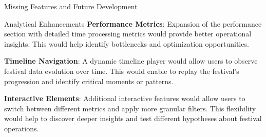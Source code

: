 \begin{section}{Missing Features and Future Development}
\begin{subsection}{Analytical Enhancements}
		\textbf{Performance Metrics}: Expansion of the performance section with detailed time processing metrics would provide better operational insights.
		This would help identify bottlenecks and optimization opportunities.

		\textbf{Timeline Navigation}: A dynamic timeline player would allow users to observe festival data evolution over time.
		This would enable to replay the festival's progression and identify critical moments or patterns.

		\textbf{Interactive Elements}: Additional interactive features would allow users to switch between different metrics and apply more granular filters.
		This flexibility would help to discover deeper insights and test different hypotheses about festival operations.
	\end{subsection}
\end{section}


